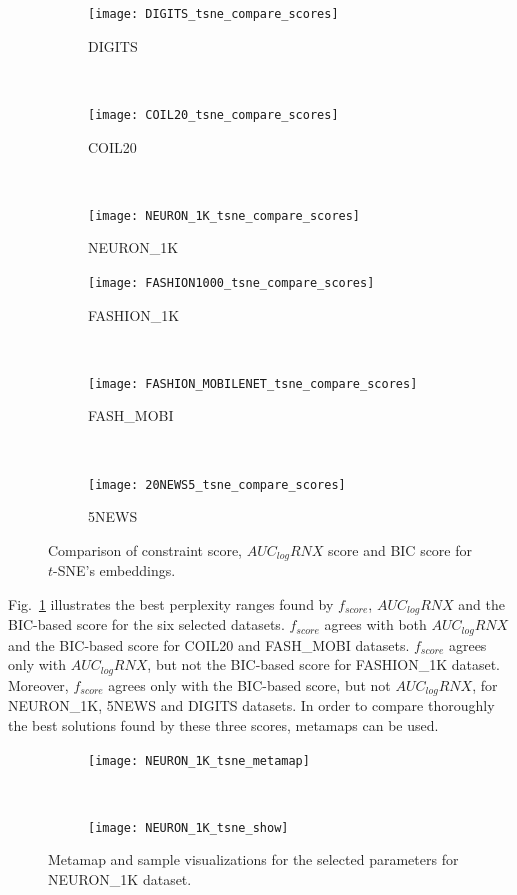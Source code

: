 \begin{figure}[ht!]
    \centering
    \begin{subfigure}[b]{0.3\linewidth}
        \centering
        \texttt{[image: DIGITS\_tsne\_compare\_scores]}
        \caption{DIGITS}
    \end{subfigure}
    ~
    \begin{subfigure}[b]{0.3\linewidth}
        \texttt{[image: COIL20\_tsne\_compare\_scores]}
        \caption{COIL20}
    \end{subfigure}
    ~
    \begin{subfigure}[b]{0.3\linewidth}
        \texttt{[image: NEURON\_1K\_tsne\_compare\_scores]}
        \caption{NEURON\_1K}
    \end{subfigure}
    \vfill
    \begin{subfigure}[b]{0.3\linewidth}
        \centering
        \texttt{[image: FASHION1000\_tsne\_compare\_scores]}
        \caption{FASHION\_1K}
    \end{subfigure}
    ~
    \begin{subfigure}[b]{0.3\linewidth}
        \texttt{[image: FASHION\_MOBILENET\_tsne\_compare\_scores]}
        \caption{FASH\_MOBI}
    \end{subfigure}
    ~
    \begin{subfigure}[b]{0.3\linewidth}
        \texttt{[image: 20NEWS5\_tsne\_compare\_scores]}
        \caption{5NEWS}
    \end{subfigure}
    \caption{Comparison of constraint score, $AUC_{log}RNX$ score and BIC score for $t$-SNE's embeddings.}
    \label{fig:tsne:compare}
\end{figure}

Fig.~\ref{fig:tsne:compare} illustrates the best perplexity ranges found by $f_{score}$, $AUC_{log}RNX$ and the BIC-based score for the six selected datasets.
$f_{score}$ agrees with both $AUC_{log}RNX$ and the BIC-based score for COIL20 and {FASH\_MOBI} datasets.
$f_{score}$ agrees only with $AUC_{log}RNX$, but not the BIC-based score for {FASHION\_1K} dataset.
Moreover, $f_{score}$ agrees only with the BIC-based score, but not $AUC_{log}RNX$, for {NEURON\_1K}, 5NEWS and DIGITS datasets.
In order to compare thoroughly the best solutions found by these three scores, metamaps can be used.

\begin{figure}[ht!]
    \centering
    \begin{subfigure}[b]{\linewidth}
        \texttt{[image: NEURON\_1K\_tsne\_metamap]}
    \end{subfigure}
    ~
    \begin{subfigure}[b]{\linewidth}
        \texttt{[image: NEURON\_1K\_tsne\_show]}
    \end{subfigure}
    \caption{Metamap and sample visualizations for the selected parameters for {NEURON\_1K} dataset.}
    \label{fig:tsne:meta:NEURON1K}
\end{figure}

